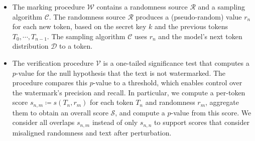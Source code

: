 \begin{itemize}[leftmargin=\itemlm,itemsep=2pt]
    \item The marking procedure $\mathcal{W}$ contains a randomness source $\mathcal{R}$ and a sampling algorithm $\mathcal{C}$.
    The randomness source $\mathcal{R}$ produces a (pseudo-random) value $r_n$ for each new token, based on the secret key $k$ and the previous tokens $T_0,\cdots,T_{n-1}$.
    The sampling algorithm $\mathcal{C}$ uses $r_n$ and the model's next token distribution $\mathcal{D}$ to  a token.
    \item The verification procedure $\mathcal{V}$ is a one-tailed significance test that computes a $p$-value for the null hypothesis that the text is not watermarked.
    The procedure compares this $p$-value to a threshold, which enables control over the watermark's precision and recall.
    In particular, we compute a per-token score $s_{n,m} \coloneqq s(T_n, r_m)$ for each token $T_n$ and randomness $r_m$, aggregate them to obtain an overall score $\mathcal{S}$, and compute a $p$-value from this score.
    We consider all overlaps $s_{n,m}$ instead of only $s_{n,n}$ to support scores that consider misaligned randomness and text after perturbation. 
    
\end{itemize}


